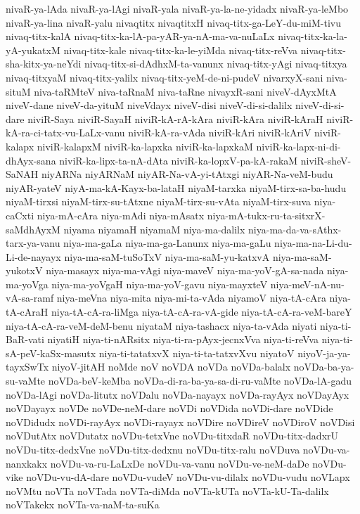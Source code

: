 {nivaR-ya-lAda
nivaR-ya-lAgi
nivaR-yala
nivaR-ya-la-ne-yidadx
nivaR-ya-leMbo
nivaR-ya-lina
nivaR-yalu
nivaqtitx
nivaqtitxH
nivaq-titx-ga-LeY-du-miM-tivu
nivaq-titx-kalA
nivaq-titx-ka-lA-pa-yAR-ya-nA-ma-va-nuLaLx
nivaq-titx-ka-la-yA-yukatxM
nivaq-titx-kale
nivaq-titx-ka-le-yiMda
nivaq-titx-reVva
nivaq-titx-sha-kitx-ya-neYdi
nivaq-titx-si-dAdhxM-ta-vanunx
nivaq-titx-yAgi
nivaq-titxya
nivaq-titxyaM
nivaq-titx-yalilx
nivaq-titx-yeM-de-ni-pudeV
nivarxyX-sani
niva-situM
niva-taRMteV
niva-taRnaM
niva-taRne
nivayxR-sani
niveV-dAyxMtA
niveV-dane
niveV-da-yituM
niveVdayx
niveV-disi
niveV-di-si-dalilx
niveV-di-si-dare
niviR-Saya
niviR-SayaH
niviR-kA-rA-kAra
niviR-kAra
niviR-kAraH
niviR-kA-ra-ci-tatx-vu-LaLx-vanu
niviR-kA-ra-vAda
niviR-kAri
niviR-kAriV
niviR-kalapx
niviR-kalapxM
niviR-ka-lapxka
niviR-ka-lapxkaM
niviR-ka-lapx-ni-di-dhAyx-sana
niviR-ka-lipx-ta-nA-dAta
niviR-ka-lopxV-pa-kA-rakaM
niviR-sheV-SaNAH
niyARNa
niyARNaM
niyAR-Na-vA-yi-tAtxgi
niyAR-Na-veM-budu
niyAR-yateV
niyA-ma-kA-Kayx-ba-lataH
niyaM-tarxka
niyaM-tirx-sa-ba-hudu
niyaM-tirxsi
niyaM-tirx-su-tAtxne
niyaM-tirx-su-vAta
niyaM-tirx-suva
niya-caCxti
niya-mA-cAra
niya-mAdi
niya-mAsatx
niya-mA-tukx-ru-ta-sitxrX-saMdhAyxM
niyama
niyamaH
niyamaM
niya-ma-dalilx
niya-ma-da-va-sAthx-tarx-ya-vanu
niya-ma-gaLa
niya-ma-ga-Lanunx
niya-ma-gaLu
niya-ma-na-Li-du-Li-de-nayayx
niya-ma-saM-tuSoTxV
niya-ma-saM-yu-katxvA
niya-ma-saM-yukotxV
niya-masayx
niya-ma-vAgi
niya-maveV
niya-ma-yoV-gA-sa-nada
niya-ma-yoVga
niya-ma-yoVgaH
niya-ma-yoV-gavu
niya-mayxteV
niya-meV-nA-nu-vA-sa-ramf
niya-meVna
niya-mita
niya-mi-ta-vAda
niyamoV
niya-tA-cAra
niya-tA-cAraH
niya-tA-cA-ra-liMga
niya-tA-cA-ra-vA-gide
niya-tA-cA-ra-veM-bareY
niya-tA-cA-ra-veM-deM-benu
niyataM
niya-tashacx
niya-ta-vAda
niyati
niya-ti-BaR-vati
niyatiH
niya-ti-nARsitx
niya-ti-ra-pAyx-jecnxVva
niya-ti-reVva
niya-ti-sA-peV-kaSx-masutx
niya-ti-tatatxvX
niya-ti-ta-tatxvXvu
niyatoV
niyoV-ja-ya-tayxSwTx
niyoV-jitAH
noMde
noV
noVDA
noVDa
noVDa-balalx
noVDa-ba-ya-su-vaMte
noVDa-beV-keMba
noVDa-di-ra-ba-ya-sa-di-ru-vaMte
noVDa-lA-gadu
noVDa-lAgi
noVDa-litutx
noVDalu
noVDa-nayayx
noVDa-rayAyx
noVDayAyx
noVDayayx
noVDe
noVDe-neM-dare
noVDi
noVDida
noVDi-dare
noVDide
noVDidudx
noVDi-rayAyx
noVDi-rayayx
noVDire
noVDireV
noVDiroV
noVDisi
noVDutAtx
noVDutatx
noVDu-tetxVne
noVDu-titxdaR
noVDu-titx-dadxrU
noVDu-titx-dedxVne
noVDu-titx-dedxnu
noVDu-titx-ralu
noVDuva
noVDu-va-nanxkakx
noVDu-va-ru-LaLxDe
noVDu-va-vanu
noVDu-ve-neM-daDe
noVDu-vike
noVDu-vu-dA-dare
noVDu-vudeV
noVDu-vu-dilalx
noVDu-vudu
noVLapx
noVMtu
noVTa
noVTada
noVTa-diMda
noVTa-kUTa
noVTa-kU-Ta-dalilx
noVTakekx
noVTa-va-naM-ta-suKa
}
